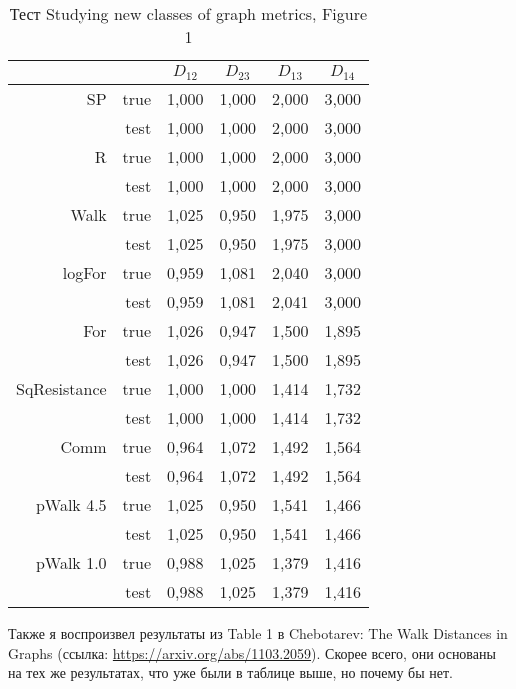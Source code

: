 \documentclass{article}
\begin{document}
\begin{table}[H]
\centering
\caption{Тест Studying new classes of graph metrics, Figure 1}
\label{}
\begin{tabular}{rr|cccc}
             &      & $D_{12}$ & $D_{23}$ & $D_{13}$ & $D_{14}$ \\
             \hline
SP           & true & 1,000 & 1,000 & 2,000 & 3,000 \\
             & test & 1,000 & 1,000 & 2,000 & 3,000 \\
             \cline{2-6}
R            & true & 1,000 & 1,000 & 2,000 & 3,000 \\
             & test & 1,000 & 1,000 & 2,000 & 3,000 \\
             \cline{2-6}
Walk         & true & 1,025 & 0,950 & 1,975 & 3,000 \\
             & test & 1,025 & 0,950 & 1,975 & 3,000 \\
             \cline{2-6}
logFor       & true & 0,959 & 1,081 & 2,040 & 3,000 \\
             & test & 0,959 & 1,081 & 2,041 & 3,000 \\
             \cline{2-6}
For          & true & 1,026 & 0,947 & 1,500 & 1,895 \\
             & test & 1,026 & 0,947 & 1,500 & 1,895 \\
             \cline{2-6}
SqResistance & true & 1,000 & 1,000 & 1,414 & 1,732 \\
             & test & 1,000 & 1,000 & 1,414 & 1,732 \\
             \cline{2-6}
Comm         & true & 0,964 & 1,072 & 1,492 & 1,564 \\
             & test & 0,964 & 1,072 & 1,492 & 1,564 \\
             \cline{2-6}
pWalk 4.5    & true & 1,025 & 0,950 & 1,541 & 1,466 \\
             & test & 1,025 & 0,950 & 1,541 & 1,466 \\
             \cline{2-6}
pWalk 1.0    & true & 0,988 & 1,025 & 1,379 & 1,416 \\
             & test & 0,988 & 1,025 & 1,379 & 1,416
\end{tabular}
\end{table}

Также я воспроизвел результаты из Table 1 в Chebotarev: The Walk Distances in Graphs (ссылка: \url{https://arxiv.org/abs/1103.2059}). Скорее всего, они основаны на тех же результатах, что уже были в таблице выше, но почему бы нет.
\end{document}
